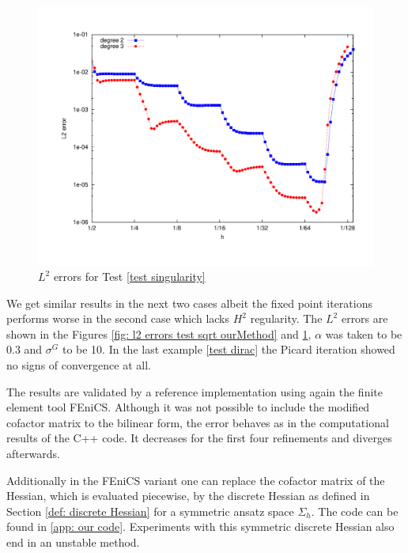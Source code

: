   
  \begin{figure}[H]
  	\centering
  	\includegraphics[scale =0.37]{plots/MA2.pdf}
  	\caption{$L^2$ errors for Test \ref{test singularity}}
  	\label{fig: l2 errors test singularity ourMethod}
  \end{figure}
We get similar results in the next two cases albeit the fixed point iterations performs worse in the second case which lacks $H^2$ regularity. The $L^2$ errors are shown in the Figures \ref{fig: l2 errors test sqrt ourMethod} and \ref{fig: l2 errors test singularity ourMethod}, $\alpha$ was taken to be 0.3 and $\sigma^G$ to be 10. In the last example \ref{test dirac} the Picard iteration showed no signs of convergence at all.

The results are validated by a reference implementation using again the finite element tool FEniCS. Although it was not possible to include the modified cofactor matrix to the bilinear form, the error behaves as in the computational results of the C++ code. It decreases for the first four refinements and diverges afterwards. 

Additionally in the FEniCS variant one can replace the cofactor matrix of the Hessian, which is evaluated piecewise, by the discrete Hessian as defined in Section \ref{def: discrete Hessian} for a symmetric ansatz space $\Sigma_h$. The code can be found in \ref{app: our code}. Experiments with this symmetric discrete Hessian also end in an unstable method.
